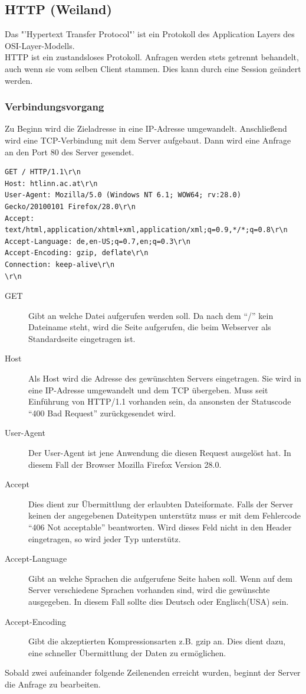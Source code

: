 \subsection{HTTP (Weiland)}

Das "'Hypertext Transfer Protocol"' ist ein Protokoll des Application Layers des OSI-Layer-Modells.
\\
HTTP ist ein zustandsloses Protokoll. Anfragen werden stets getrennt behandelt, auch wenn sie vom selben Client stammen. Dies kann durch eine Session geändert werden.
\subsubsection{Verbindungsvorgang}
Zu Beginn wird die Zieladresse in eine IP-Adresse umgewandelt.
Anschließend wird eine TCP-Verbindung  mit dem Server aufgebaut. 
Dann wird eine Anfrage an den Port 80 des Server gesendet.
\\
\begin{lstlisting}[style=custom, caption={HTTP-Request},label={lst:content_http_request}]
GET / HTTP/1.1\r\n
Host: htlinn.ac.at\r\n
User-Agent: Mozilla/5.0 (Windows NT 6.1; WOW64; rv:28.0) Gecko/20100101 Firefox/28.0\r\n
Accept: text/html,application/xhtml+xml,application/xml;q=0.9,*/*;q=0.8\r\n
Accept-Language: de,en-US;q=0.7,en;q=0.3\r\n
Accept-Encoding: gzip, deflate\r\n
Connection: keep-alive\r\n
\r\n
\end{lstlisting}

\begin{description}
\item[GET] Gibt an welche Datei aufgerufen werden soll. Da nach dem \enquote{/} kein Dateiname steht, wird die Seite aufgerufen, die beim Webserver als Standardseite eingetragen ist.
\item[Host] Als Host wird die Adresse des gewünschten Servers eingetragen. Sie wird in eine IP-Adresse umgewandelt und dem TCP übergeben. Muss seit Einführung von HTTP/1.1 vorhanden sein, da ansonsten der Statuscode \enquote{400 Bad Request} zurückgesendet wird.
\item[User-Agent] Der User-Agent ist jene Anwendung die diesen Request ausgelöst hat. In diesem Fall der Browser Mozilla Firefox Version 28.0.
\item[Accept] Dies dient zur Übermittlung der erlaubten Dateiformate. Falls der Server keinen der angegebenen Dateitypen unterstütz muss er mit dem Fehlercode \enquote{406 Not acceptable} beantworten. Wird dieses Feld nicht in den Header eingetragen, so wird jeder Typ unterstütz.
\item[Accept-Language] Gibt an welche Sprachen die aufgerufene Seite haben soll. Wenn auf dem Server verschiedene Sprachen vorhanden sind, wird die gewünschte ausgegeben. In diesem Fall sollte dies Deutsch oder Englisch(USA) sein. 
\item[Accept-Encoding] Gibt die akzeptierten Kompressionsarten z.B. gzip an. Dies dient dazu, eine schneller Übermittlung der Daten zu ermöglichen.
\end{description} 
Sobald zwei aufeinander folgende Zeilenenden erreicht wurden, beginnt der Server die Anfrage zu bearbeiten.

